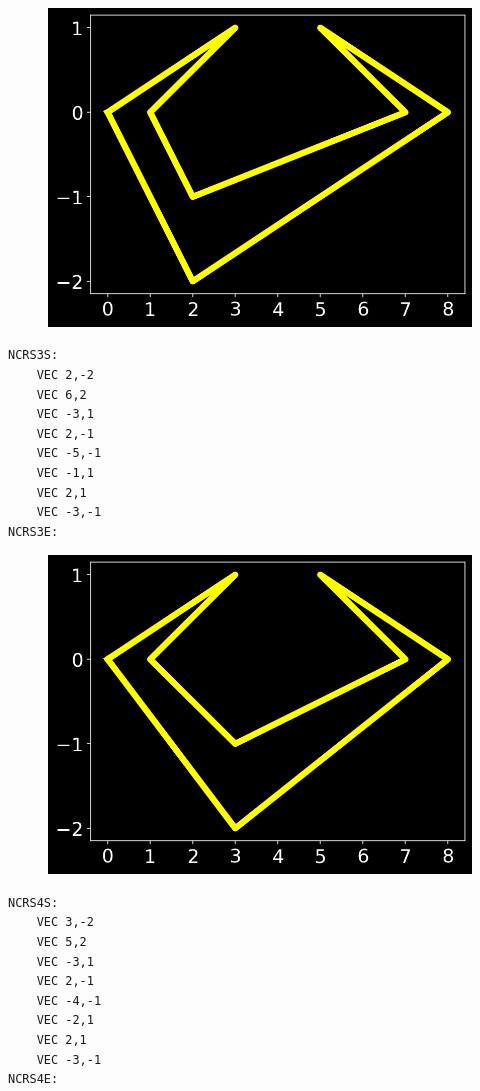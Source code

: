 \begin{minipage}[b]{0.48\linewidth}
\begin{figure}[H]
    \centering
    \begin{adjustbox}{width=4.5cm,center}
      \includegraphics[width=12cm]{src/cursors/final_cursor_2.png}%
    \end{adjustbox}
\end{figure}
\end{minipage}
\begin{minipage}[b]{0.48\linewidth}
\begin{lstlisting}
NCRS3S:
	VEC 2,-2
	VEC 6,2
	VEC -3,1
	VEC 2,-1
	VEC -5,-1
	VEC -1,1
	VEC 2,1
	VEC -3,-1
NCRS3E:
\end{lstlisting}
\end{minipage}

\begin{minipage}[b]{0.48\linewidth}
\begin{figure}[H]
    \centering
    \begin{adjustbox}{width=4.5cm,center}
      \includegraphics[width=12cm]{src/cursors/final_cursor_3.png}%
    \end{adjustbox}
\end{figure}
\end{minipage}
\begin{minipage}[b]{0.48\linewidth}
\begin{lstlisting}
NCRS4S:
	VEC 3,-2
	VEC 5,2
	VEC -3,1
	VEC 2,-1
	VEC -4,-1
	VEC -2,1
	VEC 2,1
	VEC -3,-1
NCRS4E:
\end{lstlisting}
\end{minipage}

